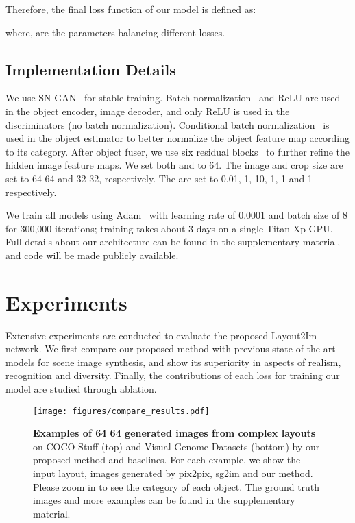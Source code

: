 \documentclass[10pt,twocolumn,letterpaper]{article}
\begin{document}
\noindent
Therefore, the final loss function of our model is defined as:

where,  are the parameters balancing different losses.

\subsection{Implementation Details}
We use SN-GAN~\cite{Miyato2018} for stable training. Batch normalization~\cite{ioffe2015batch} and ReLU are used in the object encoder, image decoder, and only ReLU is used in the discriminators (no batch normalization). Conditional batch normalization~\cite{Vries2017} is used in the object estimator to better normalize the object feature map according to its category.
After object fuser, we use six residual blocks~\cite{He2016} to further refine the hidden image feature maps.
We set both  and  to 64. The image and crop size are set to 64  64 and 32  32, respectively. 
The  are set to 0.01, 1, 10, 1, 1 and 1 respectively.

We train all models using Adam~\cite{kingma2014adam} with learning rate of 0.0001 and batch size of 8 for 300,000 iterations; training takes about 3 days on a single Titan Xp GPU.
Full details about our architecture can be found in the supplementary material, and code will be made publicly available.






\section{Experiments}
\label{sec:experiments}
Extensive experiments are conducted to evaluate the proposed Layout2Im network. We first compare our proposed method with previous state-of-the-art models for scene image synthesis, and show its superiority in aspects of realism, recognition and diversity.
Finally, the contributions of each loss for training our model are studied through ablation.

\begin{figure*}[!t]
    \begin{center}
\texttt{[image: figures/compare\_results.pdf]}
    \end{center}
    \vspace{-0.1in}
    \caption{\textbf{Examples of 64  64 generated images from complex layouts} on COCO-Stuff (top) and Visual Genome Datasets (bottom) by our proposed method and baselines. For each example, we show the input layout, images generated by pix2pix, sg2im and our method. Please zoom in to see the category of each object. The ground truth images and more examples can be found in the supplementary material.}
    \label{fig:compare_results}
\end{figure*}
\end{document}

